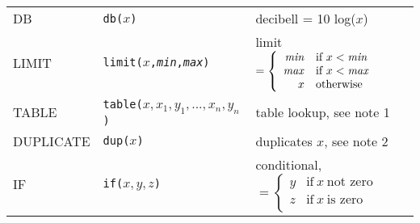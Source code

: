 \begin{table}
\begin{center}
\begin{tabular}{|l|l|l|}
DB		& {\tt db($x$)}		& decibell  = 10 log($x$) \\
LIMIT		& {\tt limit($x$,{\it min},{\it max})} & limit
					$= \left\{ \begin{array}{rl}
                                        {\it min} & \mbox{if}~ x < {\it min} \\
                                        {\it max} & \mbox{if}~ x < {\it max} \\
                                            x & \mbox{otherwise} \\
				       	\end{array}  \right. $ \\ %
TABLE		& {\tt table($x,x_1,y_1,...,x_n,y_n$)} & table lookup, 
					  see note 1 \\
DUPLICATE	& {\tt dup($x$)}	& duplicates $x$, 
					  see note 2 \\
IF		& {\tt if($x,y,z$)}     & conditional,
					$= \left\{ \begin{array}{rl}
                                        y & \mbox{if}~ x~ \mbox{not zero} \\
                                        z & \mbox{if}~ x~ \mbox{is zero} \\
				       	\end{array} \right. $ \\ %
\hline
\end{tabular}
\end{center}
\end{table}

